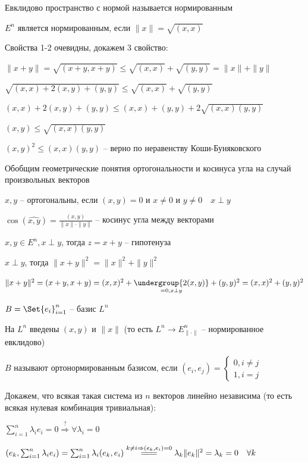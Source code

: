 \documentclass[12pt]{article}
\begin{document}
    \hypertarget{normalizedeuclidspace}{}

    Евклидово пространство с нормой называется нормированным

    \begin{MyTheorem}
        \Ths $E^n$ является нормированным, если $\|x\| = \sqrt{(x, x)}$
    \end{MyTheorem}

    \begin{MyProof}
        Свойства 1-2 очевидны, докажем 3 свойство:

        $\|x + y\| = \sqrt{(x + y, x + y)} \leq \sqrt{(x, x)} + \sqrt{(y, y)} = \|x\| + \|y\|$

        $\sqrt{(x, x) + 2(x, y) + (y, y)} \leq \sqrt{(x, x)} + \sqrt{(y, y)}$

        $(x, x) + 2(x, y) + (y, y) \leq (x, x) + (y, y) + 2\sqrt{(x, x)(y, y)}$

        $(x, y) \leq \sqrt{(x, x)(y, y)}$

        $(x, y)^2 \leq (x, x)(y, y)$ -- верно по неравенству Коши-Буняковского
    \end{MyProof}

    Обобщим геометрические понятия ортогональности и косинуса угла на случай произвольных векторов

    \Def $x, y$ -- ортогональны, если $(x, y) = 0$ и $x \neq 0$ и $y \neq 0 \quad x \perp y$

    \Def $\cos(\widehat{x, y}) = \frac{(x, y)}{\|x\|\cdot\|y\|}$ -- косинус угла между векторами

    \Def $x, y \in E^n, x \perp y$, тогда $z = x + y$ -- гипотенуза

    \begin{MyTheorem}
        \Ths $x \perp y$, тогда $\|x + y\|^2 = \|x\|^2 + \|y\|^2$
    \end{MyTheorem}

    \begin{MyProof}
        $\|x + y\|^2 = (x + y, x + y) = (x, x)^2 + \underset{= 0, x \perp y}{\undergroup{2(x, y)}} + (y, y)^2 = (x, x)^2 + (y, y)^2$
    \end{MyProof}

    \Def $B = \Set{e_i}_{i=1}^n$ -- базис $L^n$

    На $L^n$ введены $(x, y)$ и $\|x\|$ (то есть $L^n \to E^n_{\|\cdot\|}$ -- нормированное евклидово)

    \hypertarget{ortonormalizedbasis}{}

    $B$ называют ортонормированным базисом, если $(e_i, e_j) = \begin{cases}0, i \neq j \\ 1, i = j\end{cases}$

    \Nota Докажем, что всякая такая система из $n$ векторов линейно независима (то есть всякая нулевая комбинация тривиальная):

    $\sum_{i=1}^n \lambda_i e_i = 0 \stackrel{?}{\Longrightarrow} \forall \lambda_i = 0$

    $\left(e_k, \sum_{i=1}^n \lambda_i e_i\right) = \sum_{i=1}^n \lambda_i (e_k, e_i) \stackrel{k \neq i \Rightarrow (e_k, e_i) = 0}{=\joinrel=\joinrel=}
    \lambda_k \|e_k\|^2 = \lambda_k = 0 \quad \forall k$
\end{document}
